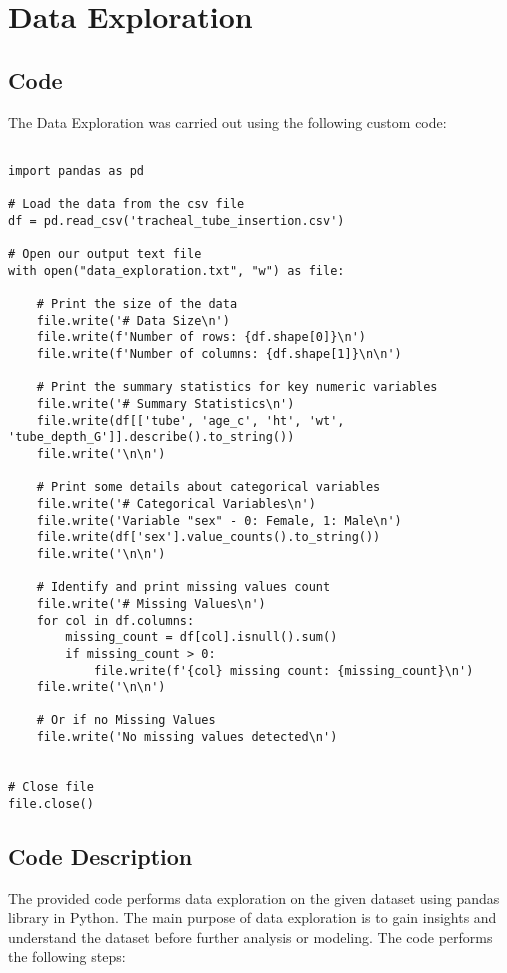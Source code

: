 \documentclass[11pt]{article}
\begin{document}
\section{Data Exploration}
\subsection{{Code}}
The Data Exploration was carried out using the following custom code:

\begin{verbatim}

import pandas as pd

# Load the data from the csv file
df = pd.read_csv('tracheal_tube_insertion.csv')

# Open our output text file
with open("data_exploration.txt", "w") as file:

    # Print the size of the data
    file.write('# Data Size\n')
    file.write(f'Number of rows: {df.shape[0]}\n')
    file.write(f'Number of columns: {df.shape[1]}\n\n')

    # Print the summary statistics for key numeric variables
    file.write('# Summary Statistics\n')
    file.write(df[['tube', 'age_c', 'ht', 'wt', 'tube_depth_G']].describe().to_string())
    file.write('\n\n')

    # Print some details about categorical variables
    file.write('# Categorical Variables\n')
    file.write('Variable "sex" - 0: Female, 1: Male\n')
    file.write(df['sex'].value_counts().to_string())
    file.write('\n\n')

    # Identify and print missing values count
    file.write('# Missing Values\n')
    for col in df.columns:
        missing_count = df[col].isnull().sum()
        if missing_count > 0:
            file.write(f'{col} missing count: {missing_count}\n')
    file.write('\n\n')

    # Or if no Missing Values
    file.write('No missing values detected\n')


# Close file
file.close()

\end{verbatim}

\subsection{Code Description}

The provided code performs data exploration on the given dataset using pandas library in Python. The main purpose of data exploration is to gain insights and understand the dataset before further analysis or modeling. The code performs the following steps:
\end{document}
